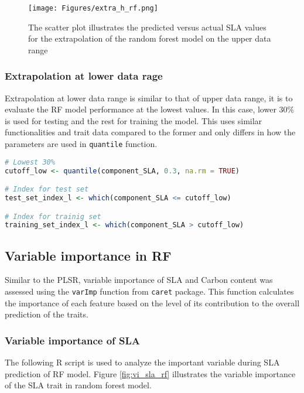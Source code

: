 \documentclass[12pt,a4paper]{report}
\begin{document}
\begin{figure}[h]
    \centering
    \texttt{[image: Figures/extra\_h\_rf.png]}
    \caption{The scatter plot illustrates the predicted versus actual SLA values for the extrapolation of the random forest model on the upper data range}
    \label{fig:extra_h_rf}
\end{figure}

\subsubsection*{Extrapolation at lower data rage}
Extrapolation at lower data range is similar to that of upper data range, it is to evaluate the RF model performance at the lowest values. In this case, lower $30\%$ is used for testing and the rest for training the model. This uses similar functionalities and trait data compared to the former and only differs in how the parameters are used in \texttt{quantile} function. \\

\begin{lstlisting}[language=R, style=mystyle]
# Lowest 30%
cutoff_low <- quantile(component_SLA, 0.3, na.rm = TRUE)

# Index for test set
test_set_index_l <- which(component_SLA <= cutoff_low)

# Index for trainig set
training_set_index_l <- which(component_SLA > cutoff_low)
\end{lstlisting}

\subsection{Variable importance in RF}
Similar to the PLSR, variable importance of SLA and Carbon content was assessed using the \texttt{varImp} function from \texttt{caret} package. This function calculates the importance of each feature based on the level of its contribution to the overall prediction of the traits. \\ 

\subsubsection*{Variable importance of SLA}
The following R script is used to analyze the important variable during SLA prediction of RF model. Figure \ref{fig:vi_sla_rf} illustrates the variable importance of the SLA trait in random forest model. \\
\end{document}
